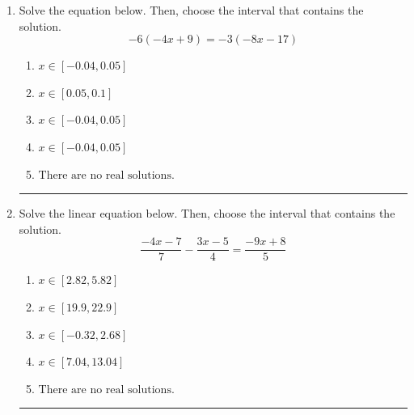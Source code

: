 \documentclass[14pt]{extbook}
\newcommand{\litem}[1]{\item#1\hspace*{-1cm}\rule{\textwidth}{0.4pt}}
\begin{document}
\begin{enumerate}
{\begin{enumerate}[label=\Alph*.]
\end{enumerate} }
\litem{
Solve the equation below. Then, choose the interval that contains the solution.\[ -6(-4x + 9) = -3(-8x -17) \]\begin{enumerate}[label=\Alph*.]
\item \( x \in [-0.04, 0.05] \)
\item \( x \in [0.05, 0.1] \)
\item \( x \in [-0.04, 0.05] \)
\item \( x \in [-0.04, 0.05] \)
\item \( \text{There are no real solutions.} \)

\end{enumerate} }
\litem{
Solve the linear equation below. Then, choose the interval that contains the solution.\[ \frac{-4x -7}{7} - \frac{3x -5}{4} = \frac{-9x + 8}{5} \]\begin{enumerate}[label=\Alph*.]
\item \( x \in [2.82, 5.82] \)
\item \( x \in [19.9, 22.9] \)
\item \( x \in [-0.32, 2.68] \)
\item \( x \in [7.04, 13.04] \)
\item \( \text{There are no real solutions.} \)


\end{enumerate}}
\end{enumerate}
\end{document}

